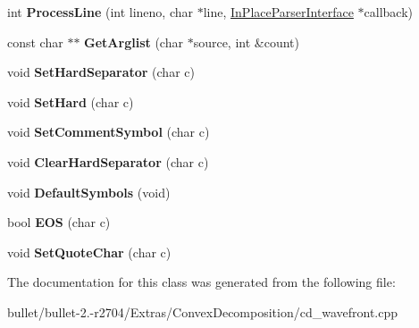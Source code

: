 \begin{DoxyCompactItemize}
\item 
\hypertarget{class_convex_decomposition_1_1_in_place_parser_a10aee3ee687b4e903c50eb97c2e71465}{int {\bfseries Process\+Line} (int lineno, char $\ast$line, \hyperlink{class_convex_decomposition_1_1_in_place_parser_interface}{In\+Place\+Parser\+Interface} $\ast$callback)}\label{class_convex_decomposition_1_1_in_place_parser_a10aee3ee687b4e903c50eb97c2e71465}

\item 
\hypertarget{class_convex_decomposition_1_1_in_place_parser_ad08b0b12f44c346e1d7522ec6f083cf1}{const char $\ast$$\ast$ {\bfseries Get\+Arglist} (char $\ast$source, int \&count)}\label{class_convex_decomposition_1_1_in_place_parser_ad08b0b12f44c346e1d7522ec6f083cf1}

\item 
\hypertarget{class_convex_decomposition_1_1_in_place_parser_a48d9930c04059eba2ce9b78b3aae990c}{void {\bfseries Set\+Hard\+Separator} (char c)}\label{class_convex_decomposition_1_1_in_place_parser_a48d9930c04059eba2ce9b78b3aae990c}

\item 
\hypertarget{class_convex_decomposition_1_1_in_place_parser_ae8335f80176f5a4e99b5ad4a9ef2e525}{void {\bfseries Set\+Hard} (char c)}\label{class_convex_decomposition_1_1_in_place_parser_ae8335f80176f5a4e99b5ad4a9ef2e525}

\item 
\hypertarget{class_convex_decomposition_1_1_in_place_parser_a35548d222464768304a7cb5e012a229b}{void {\bfseries Set\+Comment\+Symbol} (char c)}\label{class_convex_decomposition_1_1_in_place_parser_a35548d222464768304a7cb5e012a229b}

\item 
\hypertarget{class_convex_decomposition_1_1_in_place_parser_ad10fb214f45f6d3fdf85b18ddf5bf0ca}{void {\bfseries Clear\+Hard\+Separator} (char c)}\label{class_convex_decomposition_1_1_in_place_parser_ad10fb214f45f6d3fdf85b18ddf5bf0ca}

\item 
\hypertarget{class_convex_decomposition_1_1_in_place_parser_a3beaf47b79aa2c8cb1171dd09bddc208}{void {\bfseries Default\+Symbols} (void)}\label{class_convex_decomposition_1_1_in_place_parser_a3beaf47b79aa2c8cb1171dd09bddc208}

\item 
\hypertarget{class_convex_decomposition_1_1_in_place_parser_a6c838e48097802a21ef9343ba53ca99d}{bool {\bfseries E\+O\+S} (char c)}\label{class_convex_decomposition_1_1_in_place_parser_a6c838e48097802a21ef9343ba53ca99d}

\item 
\hypertarget{class_convex_decomposition_1_1_in_place_parser_af1076c062f180a555eecd22b9a1381a2}{void {\bfseries Set\+Quote\+Char} (char c)}\label{class_convex_decomposition_1_1_in_place_parser_af1076c062f180a555eecd22b9a1381a2}

\end{DoxyCompactItemize}


The documentation for this class was generated from the following file\+:\begin{DoxyCompactItemize}
\item 
bullet/bullet-\/2.-\/r2704/\+Extras/\+Convex\+Decomposition/cd\+\_\+wavefront.\+cpp\end{DoxyCompactItemize}
